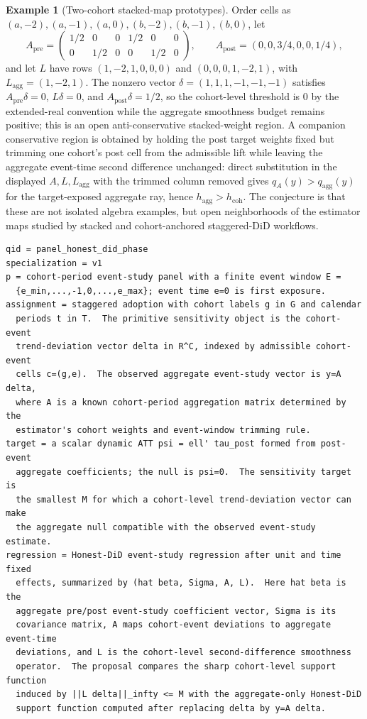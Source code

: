 \documentclass[11pt]{article}
\theoremstyle{definition}
\newtheorem{example}{Example}
\theoremstyle{plain}
\theoremstyle{remark}
\begin{document}
\begin{example}[Two-cohort stacked-map prototypes]\label{ex:stacked-prototype}
Order cells as \((a,-2),(a,-1),(a,0),(b,-2),(b,-1),(b,0)\), let
\[
A_{\mathrm{pre}}=
\begin{pmatrix}
1/2&0&0&1/2&0&0\\
0&1/2&0&0&1/2&0
\end{pmatrix},
\qquad
A_{\mathrm{post}}=(0,0,3/4,0,0,1/4),
\]
and let \(L\) have rows \((1,-2,1,0,0,0)\) and \((0,0,0,1,-2,1)\), with \(L_{\mathrm{agg}}=(1,-2,1)\).
The nonzero vector \(\delta=(1,1,1,-1,-1,-1)\) satisfies \(A_{\mathrm{pre}}\delta=0\), \(L\delta=0\), and \(A_{\mathrm{post}}\delta=1/2\), so the cohort-level threshold is \(0\) by the extended-real convention while the aggregate smoothness budget remains positive; this is an open anti-conservative stacked-weight region.
A companion conservative region is obtained by holding the post target weights fixed but trimming one cohort's post cell from the admissible lift while leaving the aggregate event-time second difference unchanged: direct substitution in the displayed \(A,L,L_{\mathrm{agg}}\) with the trimmed column removed gives \(q_A(y)>q_{\mathrm{agg}}(y)\) for the target-exposed aggregate ray, hence \(h_{\mathrm{agg}}>h_{\mathrm{coh}}\).
The conjecture is that these are not isolated algebra examples, but open neighborhoods of the estimator maps studied by stacked and cohort-anchored staggered-DiD workflows.
\end{example}

\begin{verbatim}
qid = panel_honest_did_phase
specialization = v1
p = cohort-period event-study panel with a finite event window E =
  {e_min,...,-1,0,...,e_max}; event time e=0 is first exposure.
assignment = staggered adoption with cohort labels g in G and calendar
  periods t in T.  The primitive sensitivity object is the cohort-event
  trend-deviation vector delta in R^C, indexed by admissible cohort-event
  cells c=(g,e).  The observed aggregate event-study vector is y=A delta,
  where A is a known cohort-period aggregation matrix determined by the
  estimator's cohort weights and event-window trimming rule.
target = a scalar dynamic ATT psi = ell' tau_post formed from post-event
  aggregate coefficients; the null is psi=0.  The sensitivity target is
  the smallest M for which a cohort-level trend-deviation vector can make
  the aggregate null compatible with the observed event-study estimate.
regression = Honest-DiD event-study regression after unit and time fixed
  effects, summarized by (hat beta, Sigma, A, L).  Here hat beta is the
  aggregate pre/post event-study coefficient vector, Sigma is its
  covariance matrix, A maps cohort-event deviations to aggregate event-time
  deviations, and L is the cohort-level second-difference smoothness
  operator.  The proposal compares the sharp cohort-level support function
  induced by ||L delta||_infty <= M with the aggregate-only Honest-DiD
  support function computed after replacing delta by y=A delta.
\end{verbatim}
\end{document}
